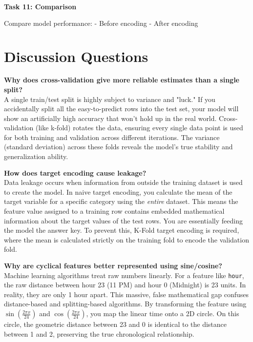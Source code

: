 \documentclass[12pt,a4paper]{article}
\begin{document}
\vspace{6pt}

\begin{tcolorbox}
\textbf{Task 11: Comparison}

Compare model performance:
- Before encoding  
- After encoding  

\vspace{2cm}

\vspace{2cm}
\end{tcolorbox}


\section*{Discussion Questions}

\textbf{Why does cross-validation give more reliable estimates than a single split?} \\
A single train/test split is highly subject to variance and "luck." If you accidentally split all the easy-to-predict rows into the test set, your model will show an artificially high accuracy that won't hold up in the real world. Cross-validation (like k-fold) rotates the data, ensuring every single data point is used for both training and validation across different iterations. The variance (standard deviation) across these folds reveals the model's true stability and generalization ability.

\vspace{10pt}

\textbf{How does target encoding cause leakage?} \\
Data leakage occurs when information from outside the training dataset is used to create the model. In naive target encoding, you calculate the mean of the target variable for a specific category using the \textit{entire} dataset. This means the feature value assigned to a training row contains embedded mathematical information about the target values of the test rows. You are essentially feeding the model the answer key. To prevent this, K-Fold target encoding is required, where the mean is calculated strictly on the training fold to encode the validation fold.

\vspace{10pt}

\textbf{Why are cyclical features better represented using sine/cosine?} \\
Machine learning algorithms treat raw numbers linearly. For a feature like \texttt{hour}, the raw distance between hour 23 (11 PM) and hour 0 (Midnight) is 23 units. In reality, they are only 1 hour apart. This massive, false mathematical gap confuses distance-based and splitting-based algorithms. By transforming the feature using $\sin\left(\frac{2\pi x}{24}\right)$ and $\cos\left(\frac{2\pi x}{24}\right)$, you map the linear time onto a 2D circle. On this circle, the geometric distance between 23 and 0 is identical to the distance between 1 and 2, preserving the true chronological relationship.
\end{document}
